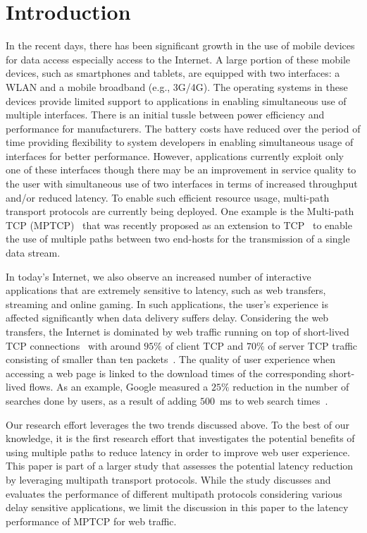 \section{Introduction}
\label{sec:introduction}
In the recent days, there has been significant growth in the use of mobile devices for data access especially access to the Internet.
A large portion of these mobile devices, such as smartphones and tablets, are equipped with two interfaces: a WLAN and a mobile broadband
(e.g., 3G/4G). The operating systems in these devices provide limited support to applications in enabling simultaneous use of
multiple interfaces. There is an initial tussle between power efficiency and performance for manufacturers. The battery costs
have reduced over the period of time providing flexibility to system developers in enabling simultaneous usage of interfaces for 
better performance. However, applications currently exploit only one of these interfaces though there may be an improvement in service
quality to the user with simultaneous use of two interfaces in terms of increased throughput and/or reduced latency. 
To enable such efficient resource usage, multi-path transport protocols are currently being deployed. 
One example is the Multi-path TCP (MPTCP)~\cite{RFC6824} that was recently proposed as an extension to
TCP~\cite{RFC793} to enable the use of multiple paths between two end-hosts for the transmission of a single data stream.

In today's Internet, we also observe an increased number of interactive applications that are extremely sensitive to latency, such as web transfers, 
streaming and online gaming. In such applications, the user's experience is affected significantly when data delivery suffers delay. 
Considering the web transfers, the Internet is dominated by web traffic running on top of short-lived TCP connections~\cite{Labovitz-IOR-2009} with
around $95\%$ of client TCP and $70\%$ of server TCP traffic consisting of smaller than ten packets~\cite{Ciullo-IEEECL-2009}.
The quality of user experience when accessing a web page is linked to the download times of the corresponding short-lived flows. As an example,
Google measured a $25\%$ reduction in the number of searches done by users, as a result of adding 
$500$~ms to web search times~\cite{why-latency-matters-2013}.

Our research effort leverages the two trends discussed above. To the best of our knowledge, it is the first research effort that investigates 
the potential benefits of using multiple paths to reduce latency in order to 
improve web user experience. This paper is part of a larger study that assesses the potential latency reduction by leveraging multipath transport protocols. 
While the study discusses and evaluates the performance of different multipath protocols considering various delay sensitive applications, we limit the 
discussion in this paper to the latency performance of MPTCP for web traffic.

